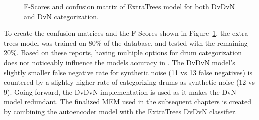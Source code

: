 \documentclass[\main/thesis.tex]{subfiles}
\begin{document}
\begin{figure}[htbp]
\begin{center}
\end{center}


\caption{F-Scores and confusion matrix of ExtraTrees model for both DvDvN and DvN categorization.}
\label{fig:conf_f1_dvn}
\end{figure}

To create the confusion matrices and the F-Scores shown in Figure~\ref{fig:conf_f1_dvn}, the extra-trees model was trained on 80\% of the database, and tested with the remaining 20\%. Based on these reports, having multiple options for drum categorization does not noticeably influence the models accuracy in \decfirst. The DvDvN model's slightly smaller false negative rate for synthetic noise (11 vs 13 false negatives) is countered by a slightly higher rate of categorizing drums as synthetic noise (12 vs 9). Going forward, the DvDvN implementation is used as it makes the DvN model redundant. The finalized MEM used in the subsequent chapters is created by combining the autoencoder model with the ExtraTrees DvDvN classifier. 
\end{document}
